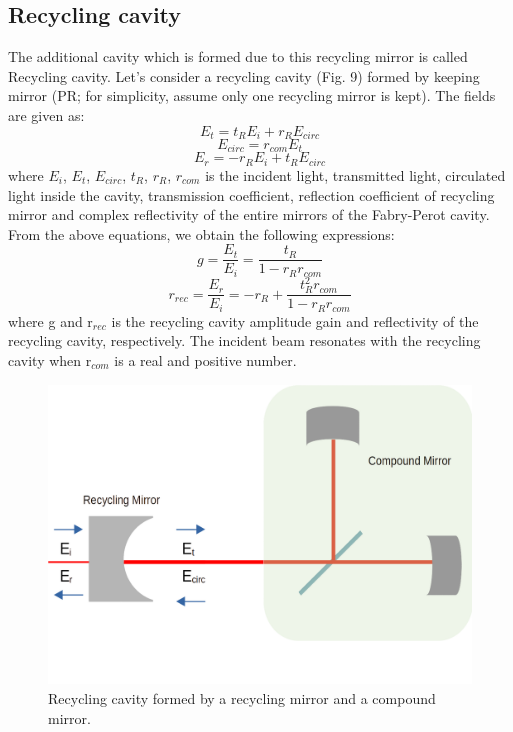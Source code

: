 \documentclass[conference]{IEEEtran}
\begin{document}
\subsection{Recycling cavity}

The additional cavity which is formed due to this recycling mirror is called Recycling cavity\cite{phdthesis4}. Let's consider a recycling cavity (Fig. 9) formed by keeping mirror (PR; for simplicity, assume only one recycling mirror is kept). The fields are given as:
\begin{equation}
E_{t}=t_{R}E_{i}+r_{R}E_{circ}
\end{equation}
\begin{equation}
E_{circ}=r_{com}E_{t}
\end{equation}
\begin{equation}
E_{r}=-r_{R}E_{i}+t_{R}E_{circ}
\end{equation}
where $E_{i}$, $E_{t}$, $E_{circ}$, $t_{R}$, $r_{R}$, $r_{com}$  is the incident light, transmitted light, circulated light inside the cavity, transmission coefficient, reflection coefficient of recycling mirror and complex reflectivity of the entire mirrors of the Fabry-Perot cavity. From the above equations, we obtain the following expressions:
\begin{equation}
g=\frac{E_{t}}{E_{i}}=\frac{t_{R}}{1-r_{R}r_{com}}
\end{equation}
\begin{equation}
r_{rec}=\frac{E_{r}}{E_{i}}=-r_{R}+ \frac{t_{R}^2 r_{com}}{1-r_{R}r_{com}}
\end{equation}
where g and r$_{rec}$ is the recycling cavity  amplitude gain and reflectivity of the recycling cavity, respectively. The incident beam resonates with the recycling cavity when r$_{com}$ is a real and positive number. 

\begin{figure}[htbp]
\centerline{\includegraphics[scale=0.15]{power.png}}
\caption{Recycling cavity formed by a recycling mirror and a compound mirror.}

\end{figure}
\end{document}
